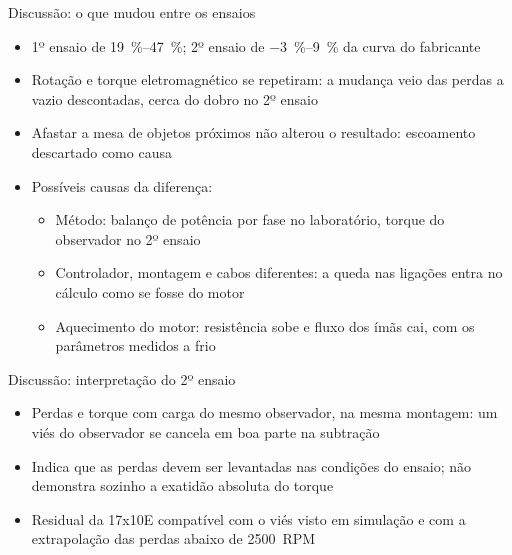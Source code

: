 \begin{frame}{Discussão: o que mudou entre os ensaios}
  \small
  \begin{itemize}
    \item 1º ensaio de \SIrange{+19}{+47}{\percent}; 2º ensaio de
          \SIrange{-3}{+9}{\percent} da curva do fabricante
    \item Rotação e torque eletromagnético se repetiram: a mudança veio das
          perdas a vazio descontadas, cerca do dobro no 2º ensaio
    \item Afastar a mesa de objetos próximos não alterou o resultado:
          escoamento descartado como causa
    \item Possíveis causas da diferença:
      \begin{itemize}
        \item Método: balanço de potência por fase no laboratório, torque do
              observador no 2º ensaio
        \item Controlador, montagem e cabos diferentes: a queda nas ligações
              entra no cálculo como se fosse do motor
        \item Aquecimento do motor: resistência sobe e fluxo dos ímãs cai,
              com os parâmetros medidos a frio
      \end{itemize}
  \end{itemize}
\end{frame}

\begin{frame}{Discussão: interpretação do 2º ensaio}
  \begin{itemize}
    \item Perdas e torque com carga do mesmo observador, na mesma montagem:
          um viés do observador se cancela em boa parte na subtração
    \item Indica que as perdas devem ser levantadas nas condições do ensaio;
          não demonstra sozinho a exatidão absoluta do torque
    \item Residual da 17x10E compatível com o viés visto em simulação e com
          a extrapolação das perdas abaixo de \SI{2500}{RPM}
  \end{itemize}
\end{frame}

